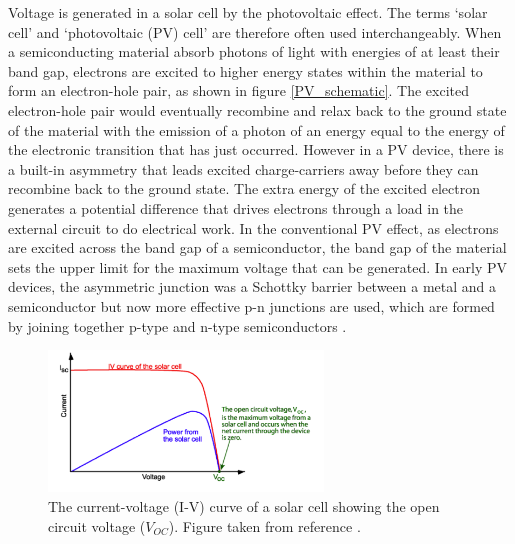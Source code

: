 Voltage is generated in a solar cell by the photovoltaic effect. The terms `solar cell' and `photovoltaic (PV) cell' are therefore often used interchangeably. When a semiconducting material absorb photons of light with energies of at least their band gap, electrons are excited to higher energy states within the material to 
form an electron-hole pair, as shown in figure \ref{PV_schematic}. The excited electron-hole pair would eventually recombine and relax back 
to the ground state of the material with the emission of a photon of an energy equal to the energy of the 
electronic transition that has just occurred. 
However in a PV device, there is a built-in asymmetry that leads excited charge-carriers away before they can recombine back to the ground state. The extra energy of the excited electron generates a potential difference that drives electrons through a load in the external circuit to 
do electrical work. In the conventional PV effect, as electrons are excited across the band gap of a semiconductor, the band gap of the material sets the upper limit for the maximum voltage that can be generated. In early PV devices, the asymmetric junction was a Schottky barrier between a metal and a 
semiconductor but now more effective p-n junctions are used, which are formed by joining together p-type and n-type semiconductors \cite{Nelson1}. \\

\begin{figure}[h!]
  \centering
    \includegraphics[width=0.65\textwidth]{figures/IV}
    \caption{The current-voltage (I-V) curve of a solar cell showing the open circuit voltage ($V_{OC}$). Figure taken from reference .}
  \label{IV}
\end{figure}

